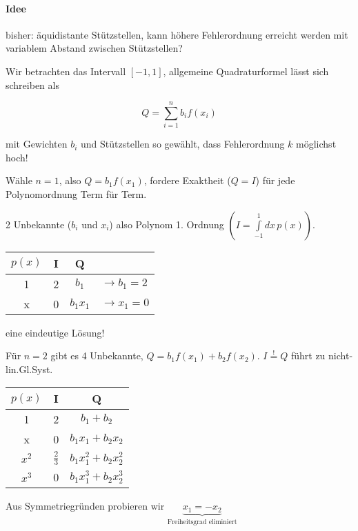 \documentclass[a4paper,ngerman]{scrbook}
\begin{document}
\paragraph{Idee}

bisher: äquidistante Stützstellen, kann höhere Fehlerordnung erreicht werden mit variablem Abstand zwischen Stützstellen?

Wir betrachten das Intervall $[-1,1]$, allgemeine Quadraturformel lässt sich schreiben als

\[
Q = \sum_{i=1}^n b_i f(x_i)
\]

mit Gewichten $b_i$ und Stützstellen so gewählt, dass Fehlerordnung $k$ möglichst hoch!

Wähle $n=1$, also $Q = b_1 f(x_1)$, fordere Exaktheit ($Q=I$) für jede Polynomordnung Term für Term.

2 Unbekannte ($b_i$ und $x_i$) also Polynom 1. Ordnung $\left(I = \int\limits_{-1}^1 dx\, p(x)\right)$.

\begin{minipage}{.5\linewidth}
  \begin{tabular}{c|c|cl}
    $p(x)$ & I & Q\\\hline
    1 & 2 & $b_1$ & $\to b_1 = 2$\\
    x & 0 & $b_1x_1$ & $\to x_1 = 0$
  \end{tabular}
\end{minipage}
\begin{minipage}{.5\linewidth}
  eine eindeutige Lösung!
\end{minipage}

Für $n=2$ gibt es 4 Unbekannte, $Q = b_1f(x_1)+b_2f(x_2)$. $I \overset{!}{=} Q$ führt zu nicht-lin.Gl.Syst.

\begin{minipage}{.35\linewidth}
  \begin{tabular}{c|c|c}
    $p(x)$ & I & Q\\\hline
    1 & 2 & $b_1 + b_2$\\
    x & 0 & $b_1x_1 + b_2x_2$\\
    $x^2$ & $\frac{2}{3}$ & $b_1x_1^2 + b_2 x_2^2$\\
    $x^3$ & 0 & $b_1x_1^3 + b_2 x_2^3$
  \end{tabular}
\end{minipage}
\begin{minipage}{.65\linewidth}
  Aus Symmetriegründen probieren wir $\underbrace{x_1 = -x_2}_{\text{Freiheitsgrad eliminiert}}$
\end{minipage}
\end{document}
